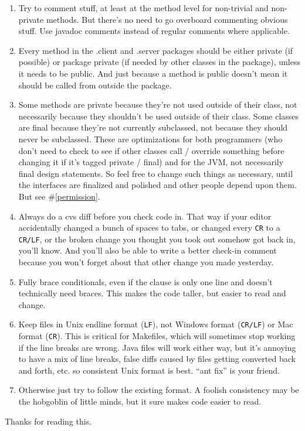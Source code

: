 \documentclass{article}
\begin{document}
\begin{enumerate}
\item Try to comment stuff, at least at the method level for
non-trivial and non-private methods. But there's no need to go 
overboard commenting obvious stuff. Use javadoc comments
instead of regular comments where applicable.

\item Every method in the .client and .server packages should be
either private (if possible) or package private (if needed
by other classes in the package), unless it needs to be public.
And just because a method is public doesn't mean it should be
called from outside the package.
\label{permission}

\item Some methods are private because they're not used outside of
their class, not necessarily because they shouldn't be used
outside of their class. Some classes are final because they're
not currently subclassed, not because they should never be
subclassed. These are optimizations for both programmers (who
don't need to check to see if other classes call / override
something before changing it if it's tagged private / final) and
for the JVM, not necessarily final design statements. So feel free
to change such things as necessary, until the interfaces are
finalized and polished and other people depend upon them. But
see \#\ref{permission}.

\item Always do a cvs diff before you check code in. That way
if your editor accidentally changed a bunch of spaces to tabs,
or changed every \texttt{CR} to a \texttt{CR/LF}, or the broken
change you thought you took out somehow got back in, you'll know.
And you'll also be able to write a better check-in comment because
you won't forget about that other change you made yesterday.

\item Fully brace conditionals, even if the clause is only one line
and doesn't technically need braces. This makes the code taller,
but easier to read and change.

\item Keep files in Unix endline format (\texttt{LF}), not Windows
format (\texttt{CR/LF}) or Mac format (\texttt{CR}). This is critical
for Makefiles, which will sometimes stop working if the line breaks
are wrong. Java files will work either way, but it's annoying to have a
mix of line breaks, false diffs caused by files getting converted back
and forth, etc. so consistent Unix format is best. ``ant fix'' is your
friend.

\item Otherwise just try to follow the existing format. A foolish
consistency may be the hobgoblin of little minds, but it sure
makes code easier to read.

\end{enumerate}

Thanks for reading this.
\end{document}

